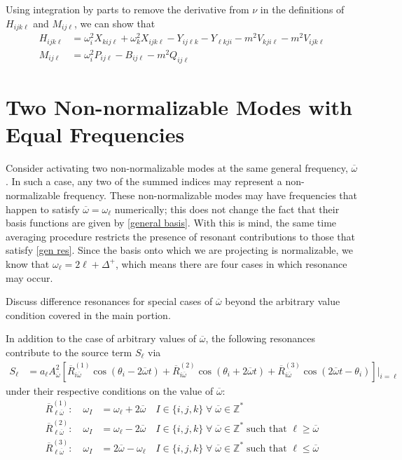 \documentclass[letterpaper,11pt]{article}
\newcommand{\oi}{\omega_i}
\newcommand{\ok}{\omega_k}
\newcommand{\ol}{\omega_\ell}
\newcommand{\ob}{\overline{\omega}}
\begin{document}
Using integration by parts to remove the derivative from $\nu$ in the definitions of $H_{ijk\ell}$ and $M_{ij\ell}$, we can show that
\begin{align}
H_{ijk\ell} &= \oi^2 X_{kij\ell} + \ok^2 X_{ijk\ell} - Y_{ij\ell k}  - Y_{\ell kji}   - m^2 V_{kji\ell} -m^2 V_{ijk\ell} \\
M_{ij\ell} &= \oi^2 P_{ij\ell} - B_{ij\ell} -m^2 Q_{ij\ell}
\end{align}

\section{Two Non-normalizable Modes with Equal Frequencies}
\label{more 2NN}

Consider activating two non-normalizable modes at the same general frequency, $\ob$. In such a case, any two of the summed indices may represent a non-normalizable frequency. These non-normalizable modes may have frequencies that happen to satisfy $\ob = \ol$ numerically; this does not change the fact that their basis functions are given by \eqref{general basis}. With this is mind, the same time averaging procedure restricts the presence of resonant contributions to those that satisfy \eqref{gen res}. Since the basis onto which we are projecting is normalizable, we know that $\ol = 2\ell + \Delta^+$, which means there are four cases in which resonance may occur.

Discuss difference resonances for special cases of $\ob$ beyond the arbitrary value condition covered in the main portion. 

In addition to the case of arbitrary values of $\ob$, the following resonances contribute to the source term $S_\ell$ via
\begin{align}
S_\ell &= a_\ell A^2_{\ob} \left[ \overline{R}^{(1)}_{i \ob} \cos \left( \theta_i - 2\ob t \right) + \overline{R}^{(2)}_{i \ob} \cos \left( \theta_i + 2\ob t \right) + \overline{R}^{(3)}_{i \ob} \cos \left( 2\ob t - \theta_i \right) \right] \Big|_{i = \ell}
\end{align}
under their respective conditions on the value of $\ob$:
\begin{align}
\label{gen NN res}
\overline{R}^{(1)}_{\ell \ob}: \quad \omega_I &= \ol + 2\ob \quad I \in \{i,j,k\} \; \forall \; \ob \in \mathbb{Z}^* \\
\overline{R}^{(2)}_{\ell \ob}: \quad \omega_I &= \ol - 2\ob \quad I \in \{i,j,k\} \; \forall \; \ob \in \mathbb{Z}^* \; \text{such that } \ell \geq \ob \\
\overline{R}^{(3)}_{\ell \ob}: \quad \omega_I &= 2\ob - \ol \quad I \in \{i,j,k\} \; \forall \; \ob \in \mathbb{Z}^* \; \text{such that } \ell \leq \ob
\end{align}
\end{document}
